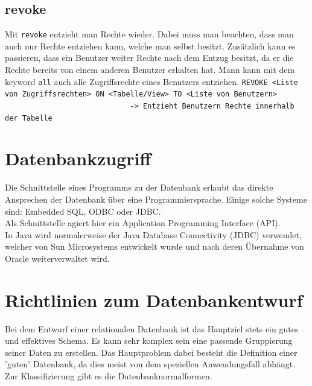 \documentclass{article}
\begin{document}
	\subsection{revoke}
	Mit \verb|revoke| entzieht man Rechte wieder. Dabei muss man beachten, dass man auch nur Rechte entziehen kann, welche man selbst besitzt. Zusätzlich kann es passieren, dass ein Benutzer weiter Rechte nach dem Entzug besitzt, da er die Rechte bereits von einem anderen Benutzer erhalten hat. Mann kann mit dem keyword \verb|all| auch alle Zugriffsrechte eines Benutzers entziehen.
	\verb|REVOKE <Liste von Zugriffsrechten> ON <Tabelle/View> TO <Liste von Benutzern>| \\
	\verb|                             -> Entzieht Benutzern Rechte innerhalb der Tabelle|
	\section{Datenbankzugriff}
	Die Schnittstelle eines Programms zu der Datenbank erlaubt das direkte Ansprechen der Datenbank über eine Programmiersprache. Einige solche Systeme sind: Embedded SQL, ODBC oder JDBC. \\
	Als Schnittstelle agiert hier ein Application Programming Interface (API). \\
	In Java wird normalerweise der Java Database Connectivity (JDBC) verwendet, welcher von Sun Microsystems entwickelt wurde und nach deren Übernahme von Oracle weiterverwaltet wird.
	\section{Richtlinien zum Datenbankentwurf}
	Bei dem Entwurf einer relationalen Datenbank ist das Hauptziel stets ein gutes und effektives Schema. Es kann sehr komplex sein eine passende Gruppierung seiner Daten zu erstellen. Das Hauptproblem dabei besteht die Definition einer 'guten' Datenbank, da dies meist von dem speziellen Anwendungsfall abhängt. Zur Klassifizierung gibt es die Datenbanknormalformen.
\end{document}
